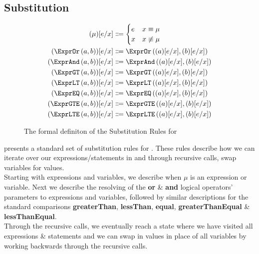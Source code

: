 \subsection{Substitution}
\label{subsec:substitution}

\begin{figure}[ht]
  \centering
\begin{align*}
  \subst{\mu}{e}{x}
  &
    \Coloneqq
    \begin{cases}
      e&x\equiv\mu\\
      x&x\not\equiv\mu\\
    \end{cases}
  \\
  \subst{\exprOr{a}{b}}{e}{x}&\Coloneqq\exprOr{\subst{a}{e}{x}}{\subst{b}{e}{x}}\\
  \subst{\exprAnd{a}{b}}{e}{x}&\Coloneqq\exprAnd{\subst{a}{e}{x}}{\subst{b}{e}{x}}\\
  \subst{\exprGT{a}{b}}{e}{x}&\Coloneqq\exprGT{\subst{a}{e}{x}}{\subst{b}{e}{x}}\\
  \subst{\exprLT{a}{b}}{e}{x}&\Coloneqq\exprLT{\subst{a}{e}{x}}{\subst{b}{e}{x}}\\
  \subst{\exprEQ{a}{b}}{e}{x}&\Coloneqq\exprEQ{\subst{a}{e}{x}}{\subst{b}{e}{x}}\\
  \subst{\exprGTE{a}{b}}{e}{x}&\Coloneqq\exprGTE{\subst{a}{e}{x}}{\subst{b}{e}{x}}\\
  \subst{\exprLTE{a}{b}}{e}{x}&\Coloneqq\exprLTE{\subst{a}{e}{x}}{\subst{b}{e}{x}}
\end{align*}
  \caption{\label{fig:subst}The formal definiton of the Substitution Rules for \thePolicyLang}
\end{figure}

 presents a standard set of substitution rules for \thePolicyLang.
These rules describe how we can iterate over our expressions/statements in \thePolicyLang and through recursive calls, swap variables for values.\\
Starting with expressions and variables, we describe when $\mu$ is an expression or variable. Next we describe the resolving of the \textbf{or} \& \textbf{and} logical operators' parameters to expressions and variables, followed by similar descriptions for the standard comparisons \textbf{greaterThan}, \textbf{lessThan}, \textbf{equal}, \textbf{greaterThanEqual} \& \textbf{lessThanEqual}.\\
Through the recursive calls, we eventually reach a state where we have visited all expressions \& statements and we can swap in values in place of all variables by working backwards through the recursive calls.
